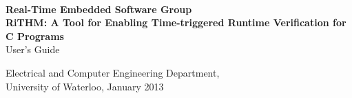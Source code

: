 \thispagestyle {empty}


\begin{center}
\noindent \HRule{1.5mm} \\[5mm]

  \noindent \normalsize \textbf{Real-Time Embedded Software Group} \\[2mm]
    \noindent \Large \textbf{RiTHM: A Tool for Enabling Time-triggered Runtime Verification for C Programs}\\[4mm]
    \noindent \large User's Guide

  \noindent \HRule{1.5mm}

  \vspace*{2cm}





  Electrical and Computer Engineering Department, \\University of Waterloo, January 2013\\

  \end{center}









